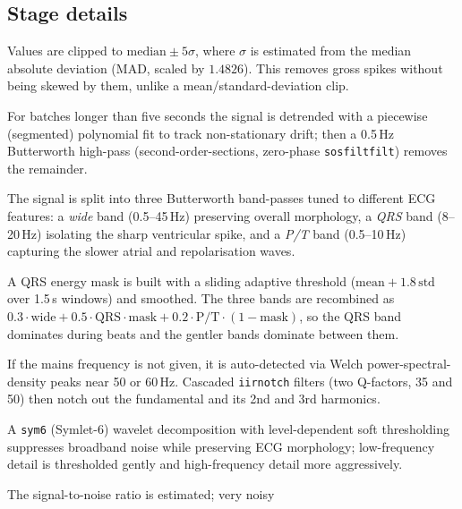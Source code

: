\subsection*{Stage details}
\begin{description}[leftmargin=0pt,style=nextline]
  \item[0. Robust outlier clipping] Values are clipped to
        $\text{median} \pm 5\sigma$, where $\sigma$ is estimated from the median
        absolute deviation (MAD, scaled by $1.4826$). This removes gross spikes
        without being skewed by them, unlike a mean/standard-deviation clip.
  \item[1. Baseline-wander removal] For batches longer than five seconds the
        signal is detrended with a piecewise (segmented) polynomial fit to track
        non-stationary drift; then a 0.5\,Hz Butterworth high-pass
        (second-order-sections, zero-phase \texttt{sosfiltfilt}) removes the
        remainder.
  \item[2. Three-band filtering] The signal is split into three Butterworth
        band-passes tuned to different ECG features: a \emph{wide} band
        (0.5--45\,Hz) preserving overall morphology, a \emph{QRS} band (8--20\,Hz)
        isolating the sharp ventricular spike, and a \emph{P/T} band (0.5--10\,Hz)
        capturing the slower atrial and repolarisation waves.
  \item[3. Adaptive QRS weighting] A QRS energy mask is built with a sliding
        adaptive threshold ($\text{mean} + 1.8\,\text{std}$ over 1.5\,s windows)
        and smoothed. The three bands are recombined as
        $0.3\cdot\text{wide} + 0.5\cdot\text{QRS}\!\cdot\!\text{mask}
        + 0.2\cdot\text{P/T}\!\cdot\!(1-\text{mask})$, so the QRS band dominates
        during beats and the gentler bands dominate between them.
  \item[4. Powerline removal] If the mains frequency is not given, it is
        auto-detected via Welch power-spectral-density peaks near 50 or 60\,Hz.
        Cascaded \texttt{iirnotch} filters (two Q-factors, 35 and 50) then notch
        out the fundamental and its 2nd and 3rd harmonics.
  \item[5. Wavelet denoising] A \texttt{sym6} (Symlet-6) wavelet decomposition with
        level-dependent soft thresholding suppresses broadband noise while
        preserving ECG morphology; low-frequency detail is thresholded gently and
        high-frequency detail more aggressively.
  \item[6. Adaptive smoothing] The signal-to-noise ratio is estimated; very noisy

\end{description}
